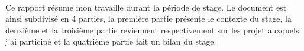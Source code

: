 \paragraph{}
Ce rapport résume mon travaille durant la période de stage. Le document est ainsi subdivisé en 4 parties, la première partie présente le contexte du stage, la deuxième et la troisième partie reviennent respectivement sur les projet auxquels j’ai participé et la quatrième partie fait un bilan du stage.


